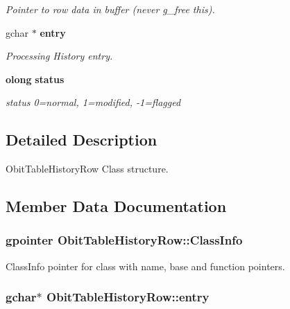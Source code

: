 \begin{CompactItemize}
\begin{CompactList}\small\item\em Pointer to row data in buffer (never g\_\-free this). \item\end{CompactList}\item 
gchar $\ast$ {\bf entry}
\begin{CompactList}\small\item\em Processing History entry. \item\end{CompactList}\item 
{\bf olong} {\bf status}
\begin{CompactList}\small\item\em status 0=normal, 1=modified, -1=flagged \item\end{CompactList}\end{CompactItemize}


\subsection{Detailed Description}
Obit\-Table\-History\-Row Class structure. 



\subsection{Member Data Documentation}
\subsubsection{\setlength{\rightskip}{0pt plus 5cm}gpointer {\bf Obit\-Table\-History\-Row::Class\-Info}}\label{structObitTableHistoryRow_o1}


Class\-Info pointer for class with name, base and function pointers. 

\subsubsection{\setlength{\rightskip}{0pt plus 5cm}gchar$\ast$ {\bf Obit\-Table\-History\-Row::entry}}\label{structObitTableHistoryRow_o6}


